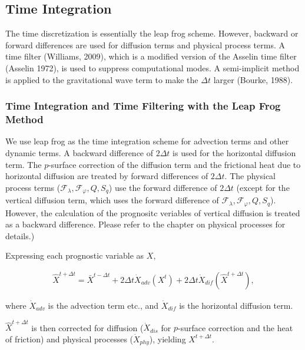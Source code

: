 \hypertarget{time-integration}{%
\subsection{Time Integration}\label{time-integration}}

The time discretization is essentially the leap frog scheme. However, backward or forward differences are used for diffusion terms and physical process terms. A time filter (Williams, 2009), which is
a modified version of the Asselin time filter (Asselin 1972), is used to suppress computational modes. A semi-implicit method is applied to the gravitational wave term to make the \(\Delta t\) larger
(Bourke, 1988).

\hypertarget{time-integration-and-time-filtering-with-leap-frog}{%
\subsubsection{Time Integration and Time Filtering with the Leap Frog Method}\label{time-integration-and-time-filtering-with-leap-frog}}

We use leap frog as the time integration scheme for advection terms and other dynamic terms. A backward difference of \(2 \Delta t\) is used for the horizontal diffusion term. The \(p\)-surface
correction of the diffusion term and the frictional heat due to horizontal diffusion are treated by forward differences of \(2 \Delta t\). The physical process terms
(\({\mathcal F}_\lambda, {\mathcal F}_\varphi, Q, S_q\)) use the forward difference of \(2 \Delta t\) (except for the vertical diffusion term, which uses the forward difference of
\({\mathcal F}_\lambda, {\mathcal F}_\varphi, Q, S_q\)). However, the calculation of the prognositc veriables of vertical diffusion is treated as a backward difference. Please refer to the chapter on
physical processes for details.)

Expressing each prognostic variable as \({X}\),

\begin{eqnarray}
\hat{X}^{t+\Delta t}
=  \bar{X}^{t-\Delta t}
+ 2 \Delta t
\dot{X}_{adv}\left( {X}^{t} \right)
+ 2 \Delta t
\dot{X}_{dif}\left( \hat{X}^{t+\Delta t} \right),
\end{eqnarray}

where \(\dot{X}_{adv}\) is the advection term etc., and \(\dot{X}_{dif}\) is the horizontal diffusion term.

\(\hat{X}^{t+\Delta t}\) is then corrected for diffusion (\(\dot{X}_{dis}\) for \(p\)-surface correction and the heat of friction) and physical processes (\(\dot{X}_{phy}\)), yielding
\({X}^{t+\Delta t}\).


